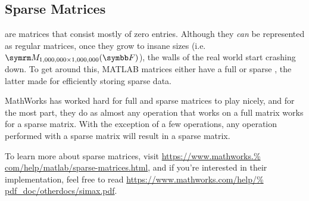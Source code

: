 \documentclass{article}
\begin{document}
\subsection{Sparse Matrices}

 are matrices that consist mostly of zero entries.  Although
they \emph{can} be represented as regular matrices, once they grow to
insane sizes (i.e.~\(\matrixField{1,000,000}{1,000,000}{F}\)), the walls
of the real world start crashing down.  To get around this, MATLAB
matrices either have a full or sparse , the latter
made for efficiently storing sparse data.

MathWorks has worked hard for full and sparse matrices to play nicely,
and for the most part, they do as almost any operation that works on a
full matrix works for a sparse matrix.  With the exception of a few
operations, any operation performed with a sparse matrix will result in
a sparse matrix.

To learn more about sparse matrices, visit \url{https://www.mathworks.%
com/help/matlab/sparse-matrices.html}, and if you're interested in their
implementation, feel free to read \url{https://www.mathworks.com/help/%
pdf_doc/otherdocs/simax.pdf}.
\end{document}
